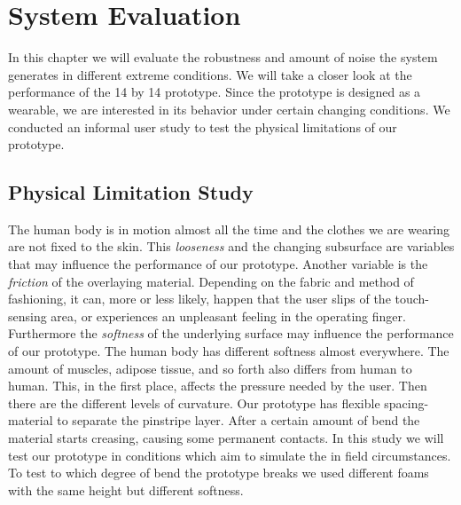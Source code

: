 \chapter{System Evaluation}

In this chapter we will evaluate the robustness and amount of noise the system generates in different extreme conditions. We will take a closer look at the performance of the 14 by 14 prototype. Since the prototype is designed as a wearable, we are interested in its behavior under certain changing conditions. We conducted an informal user study to test the physical limitations of our prototype. 

\section{Physical Limitation Study}
The human body is in motion almost all the time and the clothes we are wearing are not fixed to the skin. This \emph{looseness} and the changing subsurface are variables that may influence the performance of our prototype. Another variable is the \emph{friction} of the overlaying material. Depending on the fabric and method of fashioning, it can, more or less likely, happen that the user slips of the touch-sensing area, or experiences an unpleasant feeling in the operating finger. Furthermore the \emph{softness} of the underlying surface may influence the performance of our prototype. The human body has different softness almost everywhere. The amount of muscles, adipose tissue, and so forth also differs from human to human. This, in the first place, affects the pressure needed by the user. Then there are the different levels of curvature. Our prototype has flexible spacing-material to separate the pinstripe layer. After a certain amount of bend the material starts creasing, causing some permanent contacts. In this study we will test our prototype in conditions which aim to simulate the in field circumstances. To test to which degree of bend the prototype breaks we used different foams with the same height but different softness.

